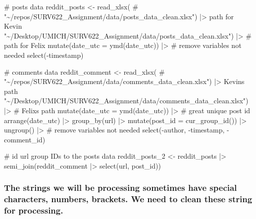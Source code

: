 \documentclass[
  letterpaper,
  DIV=11,
  numbers=noendperiod]{scrartcl}
\newenvironment{Shaded}{\begin{snugshade}}{\end{snugshade}}
\newcommand{\AttributeTok}[1]{\textcolor[rgb]{0.40,0.45,0.13}{#1}}
\newcommand{\CommentTok}[1]{\textcolor[rgb]{0.37,0.37,0.37}{#1}}
\newcommand{\FunctionTok}[1]{\textcolor[rgb]{0.28,0.35,0.67}{#1}}
\newcommand{\NormalTok}[1]{\textcolor[rgb]{0.00,0.23,0.31}{#1}}
\newcommand{\OtherTok}[1]{\textcolor[rgb]{0.00,0.23,0.31}{#1}}
\newcommand{\SpecialCharTok}[1]{\textcolor[rgb]{0.37,0.37,0.37}{#1}}
\newcommand{\StringTok}[1]{\textcolor[rgb]{0.13,0.47,0.30}{#1}}
\begin{document}
\begin{Shaded}
\begin{Highlighting}[]
\CommentTok{\# posts data}
\NormalTok{reddit\_posts }\OtherTok{\textless{}{-}} \FunctionTok{read\_xlsx}\NormalTok{(}
  \CommentTok{\# "\textasciitilde{}/repos/SURV622\_Assignment/data/posts\_data\_clean.xlsx") |\textgreater{} path for Kevin}
  \StringTok{"\textasciitilde{}/Desktop/UMICH/SURV622\_Assignment/data/posts\_data\_clean.xlsx"}\NormalTok{) }\SpecialCharTok{|\textgreater{}} \CommentTok{\# path for Felix}
  \FunctionTok{mutate}\NormalTok{(}\AttributeTok{date\_utc =} \FunctionTok{ymd}\NormalTok{(date\_utc)) }\SpecialCharTok{|\textgreater{}} 
  \CommentTok{\# remove variables not needed}
  \FunctionTok{select}\NormalTok{(}\SpecialCharTok{{-}}\NormalTok{timestamp)}


\CommentTok{\# comments data}
\NormalTok{reddit\_comment }\OtherTok{\textless{}{-}} \FunctionTok{read\_xlsx}\NormalTok{(}
  \CommentTok{\# "\textasciitilde{}/repos/SURV622\_Assignment/data/comments\_data\_clean.xlsx") |\textgreater{} Kevin\textquotesingle{}s path}
  \StringTok{"\textasciitilde{}/Desktop/UMICH/SURV622\_Assignment/data/comments\_data\_clean.xlsx"}\NormalTok{) }\SpecialCharTok{|\textgreater{}} \CommentTok{\# Felix\textquotesingle{}s path}
    \FunctionTok{mutate}\NormalTok{(}\AttributeTok{date\_utc =} \FunctionTok{ymd}\NormalTok{(date\_utc)) }\SpecialCharTok{|\textgreater{}} 
  \CommentTok{\# great unique post id}
  \FunctionTok{arrange}\NormalTok{(date\_utc) }\SpecialCharTok{|\textgreater{}} 
  \FunctionTok{group\_by}\NormalTok{(url) }\SpecialCharTok{|\textgreater{}} 
  \FunctionTok{mutate}\NormalTok{(}\AttributeTok{post\_id =} \FunctionTok{cur\_group\_id}\NormalTok{()) }\SpecialCharTok{|\textgreater{}} 
  \FunctionTok{ungroup}\NormalTok{() }\SpecialCharTok{|\textgreater{}} 
  \CommentTok{\# remove variables not needed}
  \FunctionTok{select}\NormalTok{(}\SpecialCharTok{{-}}\NormalTok{author, }\SpecialCharTok{{-}}\NormalTok{timestamp, }\SpecialCharTok{{-}}\NormalTok{comment\_id) }


\CommentTok{\# id url group IDs to the posts data}
\NormalTok{reddit\_posts\_2 }\OtherTok{\textless{}{-}}\NormalTok{ reddit\_posts }\SpecialCharTok{|\textgreater{}} 
  \FunctionTok{semi\_join}\NormalTok{(reddit\_comment }\SpecialCharTok{|\textgreater{}} \FunctionTok{select}\NormalTok{(url, post\_id)) }
\end{Highlighting}
\end{Shaded}

\subsubsection{The strings we will be processing sometimes have special
characters, numbers, brackets. We need to clean these string for
processing.}\label{the-strings-we-will-be-processing-sometimes-have-special-characters-numbers-brackets.-we-need-to-clean-these-string-for-processing.}
\end{document}

